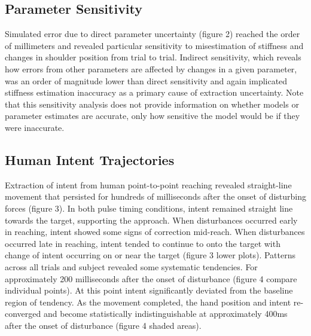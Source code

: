 \documentclass[10pt]{article}
\begin{document}
\subsection*{Parameter Sensitivity}
Simulated error due to direct parameter uncertainty (figure 2) reached the order of millimeters and revealed particular sensitivity to misestimation of stiffness and changes in shoulder position from trial to trial. Indirect sensitivity, which reveals how errors from other parameters are affected by changes in a given parameter, was an order of magnitude lower than direct sensitivity and again implicated stiffness estimation inaccuracy as a primary cause of extraction uncertainty. Note that this sensitivity analysis does not provide information on whether models or parameter estimates are accurate, only how sensitive the model would be if they were inaccurate. 

\subsection*{Human Intent Trajectories}
Extraction of intent from human point-to-point reaching revealed straight-line movement that persisted for hundreds of milliseconds after the onset of disturbing forces (figure 3). In both pulse timing conditions, intent remained straight line towards the target, supporting the approach.  When disturbances occurred early in reaching, intent showed some signs of correction mid-reach. When disturbances occurred late in reaching, intent tended to continue to onto the target with change of intent occurring on or near the target (figure 3 lower plots). 
Patterns across all trials and subject revealed some systematic tendencies. For approximately 200 milliseconds after the onset of disturbance (figure 4 compare individual points). At this point intent significantly deviated from the baseline region of tendency. As the movement completed, the hand position and intent re-converged and become statistically indistinguishable at approximately 400ms after the onset of disturbance (figure 4 shaded areas).
\end{document}
